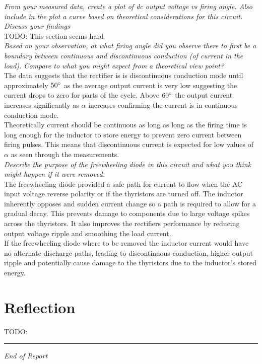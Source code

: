 \documentclass[12pt,a4paper]{article}
\begin{document}
\textit{From your measured data, create a plot of dc output voltage vs firing angle. Also include in the plot a curve based on theoretical considerations for this circuit. Discuss your findings}\\

TODO: This section seems hard\\

\textit{Based on your observation, at what firing angle did you observe there to first be a boundary between continuous and discontinuous conduction (of current in the load). Compare to what you might expect from a theoretical view point?}\\

The data suggests that the rectifier is is discontinuous conduction mode until approximately $50\degree$ as the average output current is very low suggesting the current drops to zero for parts of the cycle. Above $60\degree$ the output current increases significantly as $\alpha$ increases confirming the current is in continuous conduction mode.\\
Theoretically current should be continuous as long as long as the firing time is long enough for the inductor to store energy to prevent zero current between firing pulses. This means that discontinuous current is expected for low values of $\alpha$ as seen through the measurements.\\

\textit{Describe the purpose of the freewheeling diode in this circuit and what you think might happen if it were removed.}\\

The freewheeling diode provided a safe path for current to flow when the AC input voltage reverse polarity or if the thyristors are turned off. The inductor inherently opposes and sudden current change so a path is required to allow for a gradual decay. This prevents damage to components due to large voltage spikes across the thyristors. It also improves the rectifiers performance by reducing output voltage ripple and smoothing the load current.\\
If the freewheeling diode where to be removed the inductor current would have no alternate discharge paths, leading to discontinuous conduction, higher output ripple and potentially cause damage to the thyristors due to the inductor's stored energy.

\section{Reflection}

TODO: 

\vfill
\hrule
\begin{center}
\textit{End of Report}
\end{center}
\end{document}
